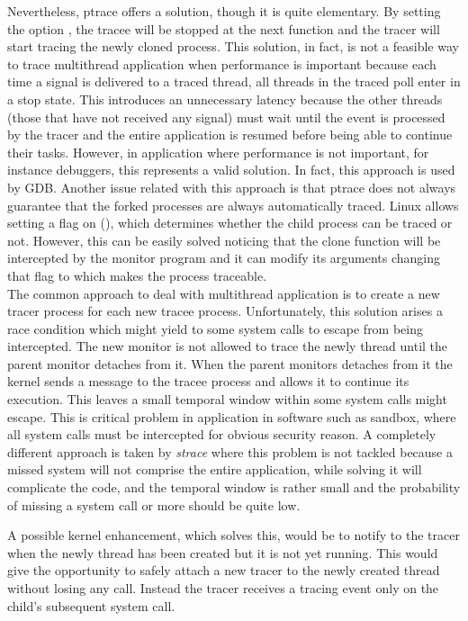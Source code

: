 Nevertheless, ptrace offers a solution, though it is quite elementary. By setting the option , the tracee will be stopped at the next  function and the tracer will start tracing the newly cloned process.  This solution, in fact, is not a feasible way to trace multithread application when performance is important because each time a signal is delivered to a traced thread, all threads in the traced poll enter in a stop state. 
This introduces an unnecessary latency because the other threads (those that have not received any signal) must wait until the event is processed by the tracer and the entire application is resumed before being able to continue their tasks. However, in application where performance is not important, for instance debuggers, this represents a valid solution. In fact, this approach is used by GDB.  Another issue related with this approach is that ptrace does not always guarantee that the forked processes are always automatically traced.  Linux allows setting a flag on  (), which determines whether the child process can be traced or not. However, this can be easily solved noticing that the clone function will be intercepted by the monitor program and it can modify its arguments changing that flag to  which makes the process traceable.\\ 
The common approach to deal with multithread application is to create a new tracer process \cite{Jain99user-levelinfrastructure, Noordende_asecure, orchestra,strace, Provos02improvinghost} for each new tracee process. Unfortunately, this solution arises a race condition which might yield to some system calls to escape from being intercepted. The new monitor is not allowed to trace the newly thread until the parent monitor detaches from it.  When the parent monitors detaches from it the kernel sends a message to the tracee process and allows it to continue its execution.  This leaves a small temporal window within some system calls might escape.  This is critical problem in application in software such as sandbox, where all system calls must be intercepted for obvious security reason. A completely different approach is taken by \emph{strace} where this problem is not tackled because a missed system will not comprise the entire application, while solving it will complicate the code, and the temporal window is rather small and the probability of missing a system call or more should be quite low.

A possible kernel enhancement, which solves this, would be to notify to the tracer when the newly thread has been created but it is not yet running. This would give the opportunity to safely attach a new tracer to the newly created thread without losing any call. Instead the tracer receives a tracing event only on the child’s subsequent system call.

